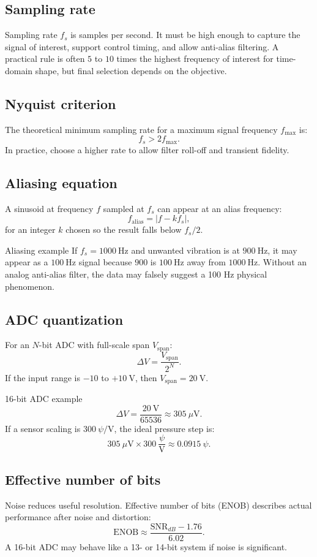 \documentclass[11pt]{article}
\newcommand{\Hz}{\mathrm{Hz}}
\newcommand{\V}{\mathrm{V}}
\begin{document}
\subsection{Sampling rate}
Sampling rate \(f_s\) is samples per second. It must be high enough to capture
the signal of interest, support control timing, and allow anti-alias filtering.
A practical rule is often \(5\) to \(10\) times the highest frequency of
interest for time-domain shape, but final selection depends on the objective.

\subsection{Nyquist criterion}
The theoretical minimum sampling rate for a maximum signal frequency \(f_{\max}\)
is:
\[
f_s > 2f_{\max}.
\]
In practice, choose a higher rate to allow filter roll-off and transient
fidelity.

\subsection{Aliasing equation}
A sinusoid at frequency \(f\) sampled at \(f_s\) can appear at an alias
frequency:
\[
f_{\mathrm{alias}} = |f - kf_s|,
\]
for an integer \(k\) chosen so the result falls below \(f_s/2\).

\begin{examplebox}{Aliasing example}
If \(f_s=1000~\Hz\) and unwanted vibration is at \(900~\Hz\), it may appear as a
\(100~\Hz\) signal because \(900\) is \(100~\Hz\) away from \(1000~\Hz\). Without
an analog anti-alias filter, the data may falsely suggest a 100 Hz physical
phenomenon.
\end{examplebox}

\subsection{ADC quantization}
For an \(N\)-bit ADC with full-scale span \(V_{\mathrm{span}}\):
\[
\Delta V = \frac{V_{\mathrm{span}}}{2^N}.
\]
If the input range is \(-10\) to \(+10~\V\), then \(V_{\mathrm{span}}=20~\V\).

\begin{examplebox}{16-bit ADC example}
\[
\Delta V = \frac{20~\V}{65536} \approx 305~\mu\V.
\]
If a sensor scaling is \(300~\psi/\V\), the ideal pressure step is:
\[
305~\mu\V \times 300~\frac{\psi}{\V} \approx 0.0915~\psi.
\]
\end{examplebox}

\subsection{Effective number of bits}
Noise reduces useful resolution. Effective number of bits (ENOB) describes
actual performance after noise and distortion:
\[
\mathrm{ENOB} \approx \frac{\mathrm{SNR}_{dB}-1.76}{6.02}.
\]
A 16-bit ADC may behave like a 13- or 14-bit system if noise is significant.
\end{document}
